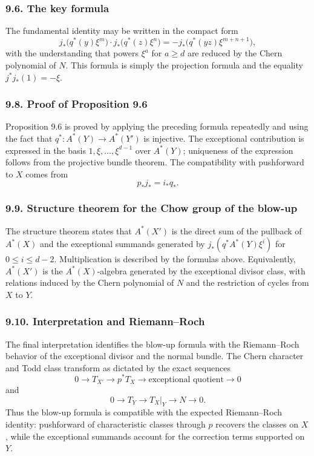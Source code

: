 \documentclass[11pt]{article}
\theoremstyle{plain}
\theoremstyle{definition}
\theoremstyle{remark}
\begin{document}
\subsubsection*{9.6. The key formula}

The fundamental identity may be written in the compact form
\[
   j_*\bigl(q^*(y)\xi^m\bigr)\cdot j_*\bigl(q^*(z)\xi^n\bigr)
     =-j_*\bigl(q^*(yz)\xi^{m+n+1}\bigr),
\]
with the understanding that powers $\xi^a$ for $a\ge d$ are reduced by the Chern polynomial of $N$. This formula is simply the projection formula and the equality $j^*j_*(1)=-\xi$.

\subsubsection*{9.8. Proof of Proposition 9.6}

Proposition 9.6 is proved by applying the preceding formula repeatedly and using the fact that $q^*:A^*(Y)\to A^*(Y')$ is injective. The exceptional contribution is expressed in the basis $1,\xi,\ldots,\xi^{d-1}$ over $A^*(Y)$; uniqueness of the expression follows from the projective bundle theorem. The compatibility with pushforward to $X$ comes from
\[
   p_*j_*=i_*q_*.
\]

\subsubsection*{9.9. Structure theorem for the Chow group of the blow-up}

The structure theorem states that $A^*(X')$ is the direct sum of the pullback of $A^*(X)$ and the exceptional summands generated by $j_*(q^*A^*(Y)\xi^i)$ for $0\le i\le d-2$. Multiplication is described by the formulas above. Equivalently, $A^*(X')$ is the $A^*(X)$-algebra generated by the exceptional divisor class, with relations induced by the Chern polynomial of $N$ and the restriction of cycles from $X$ to $Y$.

\subsubsection*{9.10. Interpretation and Riemann--Roch}

The final interpretation identifies the blow-up formula with the Riemann--Roch behavior of the exceptional divisor and the normal bundle. The Chern character and Todd class transform as dictated by the exact sequences
\[
   0\to T_{X'}\to p^*T_X\to \text{exceptional quotient}\to0
\]
and
\[
   0\to T_Y\to T_X|_Y\to N\to0.
\]
Thus the blow-up formula is compatible with the expected Riemann--Roch identity: pushforward of characteristic classes through $p$ recovers the classes on $X$, while the exceptional summands account for the correction terms supported on $Y$.
\end{document}
